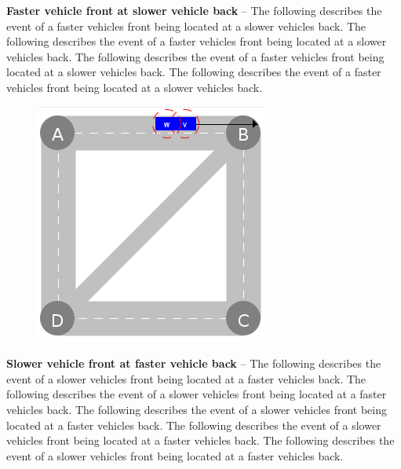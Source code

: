\documentclass[graybox]{svmult}
\begin{document}
\noindent
\textbf{Faster vehicle front at slower vehicle back}
--
The following describes the event of a faster vehicles front being located at a slower vehicles back.
The following describes the event of a faster vehicles front being located at a slower vehicles back.
The following describes the event of a faster vehicles front being located at a slower vehicles back.
The following describes the event of a faster vehicles front being located at a slower vehicles back.

\vspace{4mm}
\begin{figure}
	\centering
	\includegraphics[scale=0.35]{../../events/slower-vehicle-front-at-faster-vehicle-back.png}
\end{figure}

\noindent
\textbf{Slower vehicle front at faster vehicle back}
--
The following describes the event of a slower vehicles front being located at a faster vehicles back.
The following describes the event of a slower vehicles front being located at a faster vehicles back.
The following describes the event of a slower vehicles front being located at a faster vehicles back.
The following describes the event of a slower vehicles front being located at a faster vehicles back.
The following describes the event of a slower vehicles front being located at a faster vehicles back.


\vspace{4mm}
\end{document}
